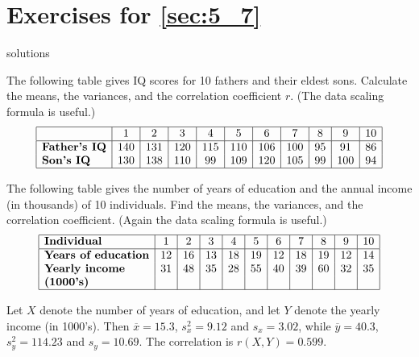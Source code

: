 
\section*{Exercises for \ref{sec:5_7}}

\begin{Filesave}{solutions}
\end{Filesave}

\begin{ex}
The following table gives IQ scores for 10 fathers and their eldest sons. 
Calculate the means, the variances, and the correlation coefficient $r$. (The data scaling formula is useful.)
\begin{equation*}
\begin{array}{|l|c|c|c|c|c|c|c|c|c|c|}
\hline
							&   1 &   2 &   3 &   4 &   5 &   6 &   7 &   8 &   9 &  10 \\ \hline
\textbf{\mbox{Father's IQ}} & 140 & 131 & 120 & 115 & 110 & 106 & 100 &  95 &  91 &  86 \\ 
\textbf{\mbox{Son's IQ}} 	& 130 & 138 & 110 &  99 & 109 & 120 & 105 &  99 & 100 &  94 \\ \hline
\end{array}
\end{equation*}
\end{ex}

\begin{ex}
The following table gives the number of years of education and the annual income (in thousands) of 10 individuals. Find the means, the variances, and the correlation coefficient. (Again the data scaling formula is useful.)
\begin{equation*}
\begin{array}{|l|c|c|c|c|c|c|c|c|c|c|}
\hline
\textbf{\mbox{Individual}} 			&  1 &  2 &  3 &  4 &  5 &  6 &  7 &  8 &  9 & 10 \\ \hline
\textbf{\mbox{Years of education}} 	& 12 & 16 & 13 & 18 & 19 & 12 & 18 & 19 & 12 & 14 \\ 
\textbf{\mbox{Yearly income}} 		& 31 & 48 & 35 & 28 & 55 & 40 & 39 & 60 & 32 & 35 \\
\textbf{\mbox{(1000's)}} &&&&&&&&&& \\ \hline
\end{array}
\end{equation*}
\begin{sol}
Let $X$ denote the number of years of education, and let $Y$ denote the yearly income (in 1000's). Then $\overline{x} = 15.3$, $s_x^2 = 9.12$ and $s_{x} = 3.02$, while $\overline{y} = 40.3$, $s_y^2 = 114.23$ and $s_{y} = 10.69$. The correlation is $r(X, Y) = 0.599$.
\end{sol}
\end{ex}


